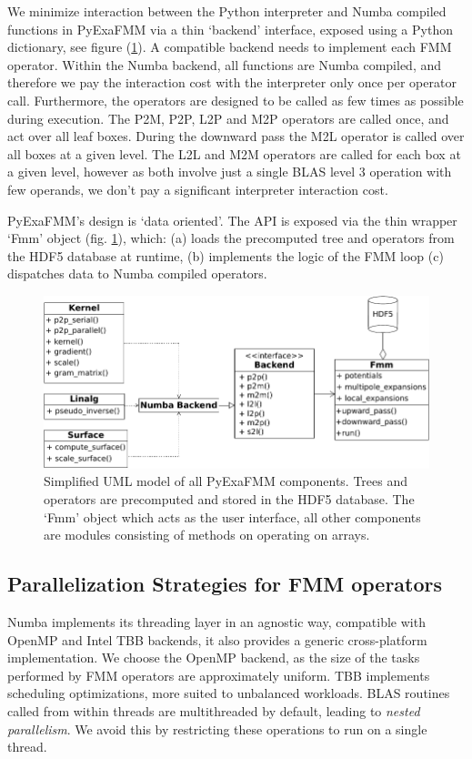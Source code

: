 \documentclass{IEEEcsmag}
\begin{document}
We minimize interaction between the Python interpreter and Numba compiled functions in PyExaFMM via a thin `backend' interface, exposed using a Python dictionary, see figure (\ref{fig:design}). A compatible backend needs to implement each FMM operator. Within the Numba backend, all functions are Numba compiled, and therefore we pay the interaction cost with the interpreter only once per operator call. Furthermore, the operators are designed to be called as few times as possible during execution. The P2M, P2P, L2P and M2P operators are called once, and act over all leaf boxes. During the downward pass the M2L operator is called over all boxes at a given level. The L2L and M2M operators are called for each box at a given level, however as both involve just a single BLAS level 3 operation with few operands, we don't pay a significant interpreter interaction cost.

PyExaFMM's design is `data oriented'. The API is exposed via the thin wrapper `Fmm' object (fig. \ref{fig:design}), which: (a) loads the precomputed tree and operators from the HDF5 database at runtime, (b) implements the logic of the FMM loop (c) dispatches data to Numba compiled operators.

\begin{figure}
	\centerline{\includegraphics {figures/software.pdf}}
	\caption{Simplified UML model of all PyExaFMM components. Trees and operators are precomputed and stored in the HDF5 database. The `Fmm' object which acts as the user interface, all other components are modules consisting of methods on operating on arrays.}
	\label{fig:design}
\end{figure}

\subsection{Parallelization Strategies for FMM operators}

Numba implements its threading layer in an agnostic way, compatible with OpenMP and Intel TBB backends, it also provides a generic cross-platform implementation. We choose the OpenMP backend, as the size of the tasks performed by FMM operators are approximately uniform. TBB implements scheduling optimizations, more suited to unbalanced workloads. BLAS routines called from within threads are multithreaded by default, leading to \textit{nested parallelism}. We avoid this by restricting these operations to run on a single thread.
\end{document}
